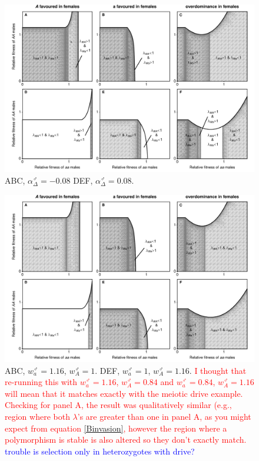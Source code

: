 \documentclass[12pt]{article}
\begin{document}
\begin{figure}[!h]
\centering
\centerline{\includegraphics[width=\linewidth]{Region_Plot_combined_MaleDrive_Mike}}
\caption{
ABC, $\alpha_{\Delta}^\male=-0.08$
DEF, $\alpha_{\Delta}^\male=0.08$. 
}
\label{fig:regionMaleDrive}
\end{figure}

\newpage
\begin{figure}[!h]
\centering
\centerline{\includegraphics[width=\linewidth]{Region_Plot_combined_MaleGS_Mike}}
\caption{
ABC, $w_{a}^\male=1.16$, $w_{A}^\male=1$.
DEF, $w_{a}^\male=1$, $w_{A}^\male=1.16$. 
\textcolor{red}{I thought that re-running this with $w_{a}^\male=1.16$, $w_{A}^\male=0.84$ and $w_{a}^\male=0.84$, $w_{A}^\male=1.16$ will mean that it matches exactly with the meiotic drive example. Checking for panel A, the result was qualitatively similar (e.g., region where both $\lambda$'s are greater than one in panel A, as you might expect from equation \eqref{Binvasion}, however the region where a polymorphism is stable is also altered so they don't exactly match. }
\textcolor{blue}{trouble is selection only in heterozygotes with drive?}
}
\label{fig:regionMaleGS}
\end{figure}
\end{document}
